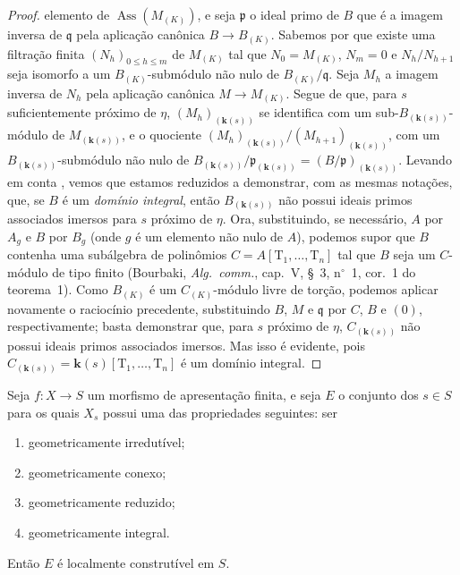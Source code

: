 \begin{proof}
elemento de $\operatorname{Ass}(M_{(K)})$, e seja $\mathfrak{p}$ o ideal primo de $B$ que é a imagem inversa de $\mathfrak{q}$ pela aplicação canônica $B\to B_{(K)}$.
Sabemos por  que existe uma filtração finita $(N_h)_{0\leqslant h\leqslant m}$ de $M_{(K)}$ tal que $N_0=M_{(K)}$, $N_m=0$ e $N_h/N_{h+1}$ seja isomorfo a um $B_{(K)}$-submódulo não nulo de $B_{(K)}/\mathfrak{q}$.
Seja $M_h$ a imagem inversa de $N_h$ pela aplicação canônica $M\to M_{(K)}$.
Segue de  que, para $s$ suficientemente próximo de $\eta$, $(M_h)_{(\boldsymbol{k}(s))}$ se identifica com um sub-$B_{(\boldsymbol{k}(s))}$-módulo de $M_{(\boldsymbol{k}(s))}$, e o quociente $(M_h)_{(\boldsymbol{k}(s))}/(M_{h+1})_{(\boldsymbol{k}(s))}$, com um $B_{(\boldsymbol{k}(s))}$-submódulo não nulo de $B_{(\boldsymbol{k}(s))}/\mathfrak{p}_{(\boldsymbol{k}(s))}=(B/\mathfrak{p})_{(\boldsymbol{k}(s))}$.
Levando em conta , vemos que estamos reduzidos a demonstrar, com as mesmas notações, que, se $B$ é um \emph{domínio integral}, então $B_{(\boldsymbol{k}(s))}$ não possui ideais primos associados imersos para $s$ próximo de $\eta$.
Ora, substituindo, se necessário, $A$ por $A_g$ e $B$ por $B_g$ (onde $g$ é um elemento não nulo de $A$), podemos supor que $B$ contenha uma subálgebra de polinômios $C=A[\mathrm{T}_1,\ldots,\mathrm{T}_n]$ tal que $B$ seja um $C$-módulo de tipo finito (Bourbaki, \emph{Alg.\ comm.}, cap.\ V, \S~3, n$^\circ$~1, cor.\ 1 do teorema~1).
Como $B_{(K)}$ é um $C_{(K)}$-módulo livre de torção, podemos aplicar novamente o raciocínio precedente, substituindo $B$, $M$ e $\mathfrak{q}$ por $C$, $B$ e $(0)$, respectivamente; basta demonstrar que, para $s$ próximo de $\eta$, $C_{(\boldsymbol{k}(s))}$ não possui ideais primos associados imersos.
Mas isso é evidente, pois $C_{(\boldsymbol{k}(s))}=\boldsymbol{k}(s)[\mathrm{T}_1,\ldots,\mathrm{T}_n]$ é um domínio integral.
\end{proof}

\begin{theorem}[9.7.7]
\label{IV.9.7.7}
Seja $f:X\to S$ um morfismo de apresentação finita, e seja $E$ o conjunto dos $s\in S$ para os quais $X_s$ possui uma das propriedades seguintes: ser
\begin{enumerate}[label=(\roman*)]
  \item geometricamente irredutível;
  \item geometricamente conexo;
  \item geometricamente reduzido;
  \item geometricamente integral.
\end{enumerate}
Então $E$ é localmente construtível em $S$.
\end{theorem}


